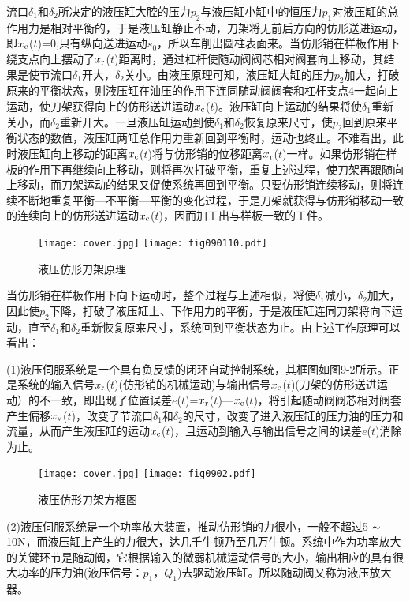 

    流口$\delta_1$和$\delta_2$所决定的液压缸大腔的压力$p_2$与液压缸小缸中的恒压力$p_1$对液压缸的总作用力是相对平衡的，于是液压缸静止不动，刀架将无前后方向的仿形送进运动，即$x_{\rm c}$($t$)=0,只有纵向送进运动$s_0$，所以车削出圆柱表面来。当仿形销在样板作用下绕支点向上摆动了$x_{\rm r}$($t$)距离时，通过杠杆使随动阀阀芯相对阀套向上移动，其结果是使节流口$\delta_1$开大，$\delta_2$关小。由液压原理可知，液压缸大缸的压力$p_2$加大，打破原来的平衡状态，则液压缸在油压的作用下连同随动阀阀套和杠杆支点4一起向上运动，使刀架获得向上的仿形送进运动$x_{\rm c}$($t$)。液压缸向上运动的结果将使$\delta_1$重新关小，而$\delta_2$重新开大。一旦液压缸运动到使$\delta_1$和$\delta_2$恢复原来尺寸，使$p_2$回到原来平衡状态的数值，液压缸两缸总作用力重新回到平衡时，运动也终止。不难看出，此时液压缸向上移动的距离$x_{\rm c}$($t$)将与仿形销的位移距离$x_{\rm r}$($t$)一样。如果仿形销在样板的作用下再继续向上移动，则将再次打破平衡，重复上述过程，使刀架再跟随向上移动，而刀架运动的结果又促使系统再回到平衡。只要仿形销连续移动，则将连续不断地重复平衡—不平衡—平衡的变化过程，于是刀架就获得与仿形销移动一致的连续向上的仿形送进运动$x_{\rm c}$($t$)，因而加工出与样板一致的工件。
\begin{figure}
\centering
\ifOpenSource
\texttt{[image: cover.jpg]}
\else
\texttt{[image: fig090110.pdf]}
\fi
\caption{液压仿形刀架原理}
\label{fig:fig0901}
\end{figure}
    当仿形销在样板作用下向下运动时，整个过程与上述相似，将使$\delta_1$减小，$\delta_2$加大，因此使$p_2$下降，打破了液压缸上、下作用力的平衡，于是液压缸连同刀架将向下运动，直至$\delta_1$和$\delta_2$重新恢复原来尺寸，系统回到平衡状态为止。由上述工作原理可以看出：

(1)液压伺服系统是一个具有负反馈的闭环自动控制系统，其框图如图9-2所示。正是系统的输入信号$x_{\rm r}$($t$)(仿形销的机械运动)与输出信号$x_{\rm c}$($t$)(刀架的仿形送进运动）的不一致，即出现了位置误差$e$($t$)=$x_{\rm r}$($t$)—$x_{\rm c}$($t$)，将引起随动阀阀芯相对阀套产生偏移$x_{\rm v}$($t$)，改变了节流口$\delta_1$和$\delta_2$的尺寸，改变了进入液压缸的压力油的压力和流量，从而产生液压缸的运动$x_{\rm c}$($t$)，且运动到输入与输出信号之间的误差$e$($t$)消除为止。

\begin{figure}
\centering
\ifOpenSource
\texttt{[image: cover.jpg]}
\else
\texttt{[image: fig0902.pdf]}
\fi
\caption{液压仿形刀架方框图}
\label{fig:fig0902}
\end{figure}

(2)液压伺服系统是一个功率放大装置，推动仿形销的力很小，一般不超过5 $\thicksim$ 10N，而液压缸上产生的力很大，达几千牛顿乃至几万牛顿。系统中作为功率放大的关键环节是随动阀，它根据输入的微弱机械运动信号的大小，输出相应的具有很大功率的压力油(液压信号：$p_1$，$Q_1$)去驱动液压缸。所以随动阀又称为液压放大器。

